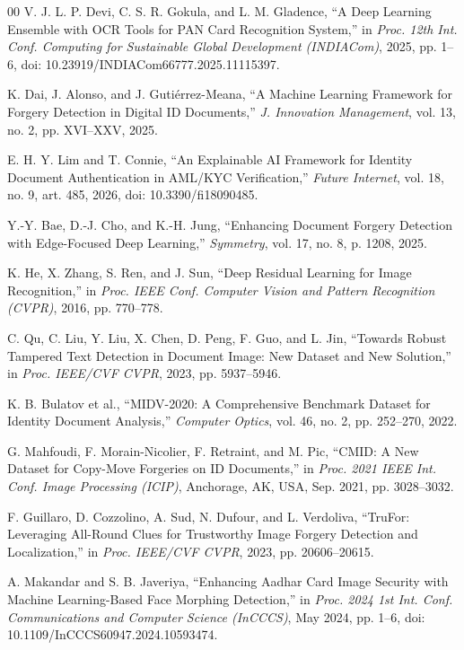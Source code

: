 \documentclass[conference]{IEEEtran}
\begin{document}
\begin{thebibliography}{00}
 V. J. L. P. Devi, C. S. R. Gokula, and L. M. Gladence,
``A Deep Learning Ensemble with OCR Tools for PAN Card Recognition
System,'' in \emph{Proc. 12th Int. Conf. Computing for Sustainable Global
Development (INDIACom)}, 2025, pp. 1--6,
doi: 10.23919/INDIACom66777.2025.11115397.

 K. Dai, J. Alonso, and J. Gutiérrez-Meana, ``A Machine
Learning Framework for Forgery Detection in Digital ID Documents,''
\emph{J. Innovation Management}, vol. 13, no. 2, pp. XVI--XXV, 2025.

 E. H. Y. Lim and T. Connie, ``An Explainable AI
Framework for Identity Document Authentication in AML/KYC
Verification,'' \emph{Future Internet}, vol. 18, no. 9, art. 485, 2026,
doi: 10.3390/fi18090485.

 Y.-Y. Bae, D.-J. Cho, and K.-H. Jung, ``Enhancing
Document Forgery Detection with Edge-Focused Deep Learning,''
\emph{Symmetry}, vol. 17, no. 8, p. 1208, 2025.

 K. He, X. Zhang, S. Ren, and J. Sun, ``Deep Residual
Learning for Image Recognition,'' in \emph{Proc. IEEE Conf. Computer
Vision and Pattern Recognition (CVPR)}, 2016, pp. 770--778.

 C. Qu, C. Liu, Y. Liu, X. Chen, D. Peng, F. Guo,
and L. Jin, ``Towards Robust Tampered Text Detection in Document
Image: New Dataset and New Solution,'' in \emph{Proc. IEEE/CVF CVPR},
2023, pp. 5937--5946.

 K. B. Bulatov et al., ``MIDV-2020: A Comprehensive
Benchmark Dataset for Identity Document Analysis,'' \emph{Computer
Optics}, vol. 46, no. 2, pp. 252--270, 2022.

 G. Mahfoudi, F. Morain-Nicolier, F. Retraint, and
M. Pic, ``CMID: A New Dataset for Copy-Move Forgeries on ID
Documents,'' in \emph{Proc. 2021 IEEE Int. Conf. Image Processing
(ICIP)}, Anchorage, AK, USA, Sep. 2021, pp. 3028--3032.

 F. Guillaro, D. Cozzolino, A. Sud, N. Dufour, and
L. Verdoliva, ``TruFor: Leveraging All-Round Clues for Trustworthy
Image Forgery Detection and Localization,'' in \emph{Proc. IEEE/CVF
CVPR}, 2023, pp. 20606--20615.

 A. Makandar and S. B. Javeriya, ``Enhancing Aadhar
Card Image Security with Machine Learning-Based Face Morphing
Detection,'' in \emph{Proc. 2024 1st Int. Conf. Communications and
Computer Science (InCCCS)}, May 2024, pp. 1--6,
doi: 10.1109/InCCCS60947.2024.10593474.


\end{thebibliography}
\end{document}
